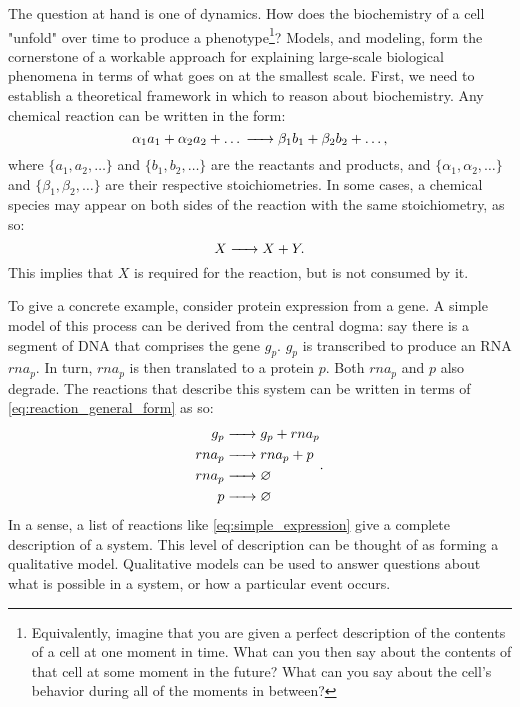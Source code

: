 The question at hand is one of dynamics. How does the biochemistry of a cell "unfold" over time to produce a phenotype\footnote{Equivalently, imagine that you are given a perfect description of the contents of a cell at one moment in time. What can you then say about the contents of that cell at some moment in the future? What can you say about the cell's behavior during all of the moments in between?}? Models, and modeling, form the cornerstone of a workable approach for explaining large-scale biological phenomena in terms of what goes on at the smallest scale. First, we need to establish a theoretical framework in which to reason about biochemistry. Any chemical reaction can be written in the form:
\begin{equation}\label{eq:reaction_general_form}
	\alpha_1 a_1 + \alpha_2 a_2 + \ldots \ce{->} \beta_1 b_1 + \beta_2 b_2 + \ldots,
\end{equation}  
where $\{a_1, a_2, \ldots \}$ and $\{b_1, b_2, \ldots \}$ are the reactants and products, and $\{\alpha_1, \alpha_2, \ldots \}$ and $\{\beta_1, \beta_2, \ldots \}$ are their respective stoichiometries. In some cases, a chemical species may appear on both sides of the reaction with the same stoichiometry, as so:
\begin{equation*}
    X \ce{->} X + Y.
\end{equation*}
This implies that $X$ is required for the reaction, but is not consumed by it.

To give a concrete example, consider protein expression from a gene. A simple model of this process can be derived from the central dogma\supercite{Crick:1958ws,Crick:1970wb}: say there is a segment of DNA that comprises the gene $g_p$. $g_p$ is transcribed to produce an RNA $rna_p$. In turn, $rna_p$ is then translated to a protein $p$. Both $rna_p$ and $p$ also degrade. The reactions that describe this system can be written in terms of \eqref{eq:reaction_general_form} as so:
\begin{align}\label{eq:simple_expression}
    \begin{split}
        g_p &\ce{->} g_p + rna_p \\
        rna_p &\ce{->} rna_p + p \\
        rna_p &\ce{->} \varnothing \\
        p &\ce{->} \varnothing
    \end{split}.
\end{align}
In a sense, a list of reactions like \eqref{eq:simple_expression} give a complete description of a system. This level of description can be thought of as forming a qualitative model. Qualitative models can be used to answer questions about what is possible in a system, or how a particular event occurs.

